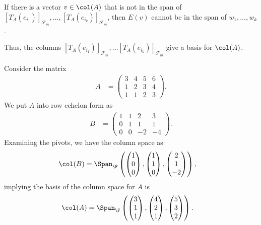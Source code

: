 \documentclass[10pt]{mypackage}
\begin{document}
If there is a vector $v\in \col(A)$ that is not in the span of $\left[T_{A}\left(e_{i_1}\right)\right]_{\mathcal{F}_m},\dots,\left[T_{A}\left(e_{i_k}\right)\right]_{\mathcal{F}_m}$, then $E(v)$ cannot be in the span of $w_1,\dots,w_k$.\newline

Thus, the columns $\left[T_A\left(e_{i_1}\right)\right]_{\mathcal{F}_m},\dots \left[T_A\left(e_{i_k}\right)\right]_{\mathcal{F}_m}$ give a basis for $\col(A)$.
\begin{example}
  Consider the matrix
  \begin{align*}
    A &= \begin{pmatrix}3&4&5&6\\1&2&3&4\\1&1&2&3\end{pmatrix}.
  \end{align*}
  We put $A$ into row echelon form as
  \begin{align*}
    B &= \begin{pmatrix}1 & 1 & 2 & 3 \\ 0 & 1 & 1 & 1 \\ 0 & 0 & -2 & -4\end{pmatrix}.
  \end{align*}
  Examining the pivots, we have the column space as
  \begin{align*}
    \col(B) &= \Span_{\F}\left( \begin{pmatrix}1\\0\\0\end{pmatrix}, \begin{pmatrix}1\\1\\0\end{pmatrix}, \begin{pmatrix}2\\1\\-2\end{pmatrix}\right),
  \end{align*}
  implying the basis of the column space for $A$ is
  \begin{align*}
    \col(A) &= \Span_{\F}\left( \begin{pmatrix}3\\1\\1\end{pmatrix}, \begin{pmatrix}4\\2\\1\end{pmatrix}, \begin{pmatrix}5\\3\\2\end{pmatrix}\right).
  \end{align*}
\end{example}
\end{document}
